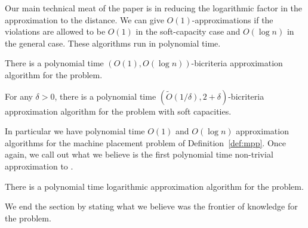 Our main technical meat of the paper is in reducing the logarithmic factor in the approximation to the distance.
We can give $O(1)$-approximations if the violations are allowed to be $O(1)$ in the soft-capacity case and $O(\log n)$ in the general case.
These algorithms run in polynomial time.
\begin{theorem}\label{thm:2}
	There is a polynomial time  $(O(1),O(\log n))$-bicriteria approximation algorithm for the \mckc problem.
\end{theorem}
\begin{theorem}\label{thm:2a}
	For any $\delta>0$, there is a polynomial time  $(\tilde{O}(1/\delta),2+\delta)$-bicriteria approximation algorithm for the \mckc problem with soft capacities.
\end{theorem}
In particular we have polynomial time $O(1)$ and $O(\log n)$ approximation algorithms for the machine placement problem of Definition~\ref{def:mpp}.
Once again, we call out what we believe is the first polynomial time non-trivial approximation to \cckp.
\begin{theorem}\label{thm:cckp}
	There is a polynomial time logarithmic approximation algorithm for the \cckp problem.
\end{theorem}
We end the section by stating what we believe was the frontier of knowledge for the \cckp problem.
